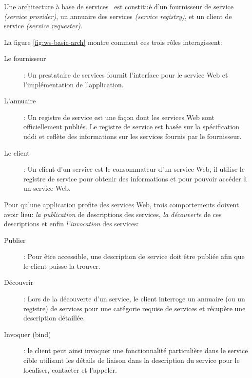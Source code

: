   Une architecture à base de
  services~\cite{gottschalk2002introduction} est constitué d'un
  fournisseur de service \textit{(service provider)}, un annuaire des
  services \textit{(service registry)}, et un client de service
  \textit{(service requester)}.

  


  La figure \ref{fig:ws-basic-arch} montre comment ces trois rôles
  interagissent:

  \renewcommand{\descriptionlabel}[1]{\hspace{0.5cm}\textbullet~\textsf{#1}}
  \begin{description}
  \item[Le fournisseur]: Un prestataire de services fournit
    l'interface pour le service Web et l'implémentation de
    l'application.

  \item[L'annuaire]: Un registre de service est une façon dont les
    services Web sont officiellement publiés. Le registre de service
    est basée sur la spécification \acrshort{uddi} et reflète des
    informations sur les services fournis par le fournisseur.

  \item[Le client]: Un client d'un service est le consommateur d'un
    service Web, il utilise le registre de service pour obtenir des
    informations et pour pouvoir accéder à un service Web.
  \end{description}
  \enddescription

  Pour qu'une application profite des services Web, trois
  comportements doivent avoir lieu: \textit{la publication} de
  descriptions des services, \textit{la découverte} de ces
  descriptions et enfin \textit{l'invocation} des services:

  \renewcommand{\descriptionlabel}[1]{\hspace{0.5cm}\textbullet~\textsf{#1}}
  \begin{description}
  \item[Publier]: Pour être accessible, une description de service
    doit être publiée afin que le client puisse la trouver.

  \item[Découvrir]: Lors de la découverte d'un service, le client
    interroge un annuaire (ou un registre) de services pour une
    catégorie requise de services et récupère une description
    détaillée.

  \item[Invoquer (bind)]: le client peut ainsi invoquer une
    fonctionnalité particulière dans le service cible utilisant les
    détails de liaison dans la description du service pour le
    localiser, contacter et l'appeler.
  \end{description}
  \enddescription

